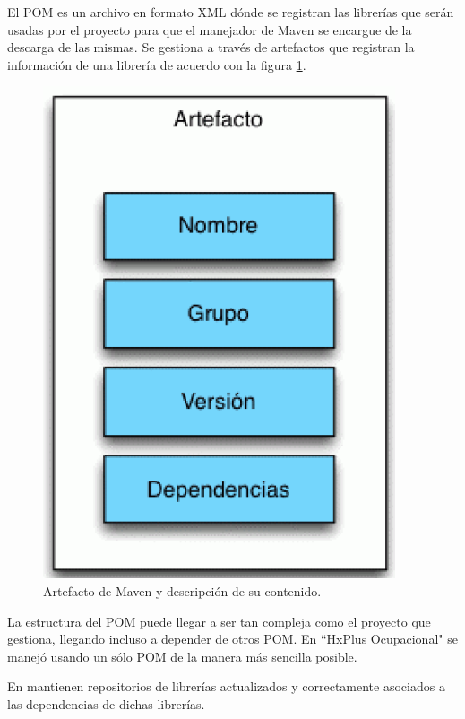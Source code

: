         El POM es un archivo en formato XML dónde se registran las librerías que serán usadas por el proyecto  para que el manejador de Maven se encargue de la descarga de las mismas. Se gestiona a través de artefactos que registran la información de una librería de acuerdo con la figura \ref{pom-artifact}.
        
        \begin{figure}[htbp!]
            \begin{center}
                \includegraphics[scale=0.4]{figures/pomartifact}
            \end{center}
            \caption{Artefacto de Maven y descripción de su contenido.}
            \label{pom-artifact}
        \end{figure}
        
        La estructura del POM puede llegar a ser tan compleja como el proyecto que gestiona, llegando incluso a depender de otros POM. En ``HxPlus Ocupacional" se manejó usando un sólo POM de la manera más sencilla posible.
        
        En \cite{APACHE-maven} mantienen repositorios de librerías actualizados y correctamente asociados a las dependencias de dichas librerías.
        
